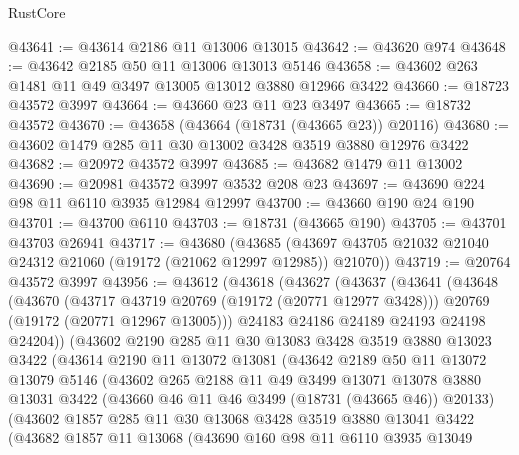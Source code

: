 \begin{lexlean}{RustCore}
\begin{coremodule}
@43641 := @43614 @2186 @11 @13006 @13015
@43642 := @43620 @974
@43648 := @43642 @2185 @50 @11 @13006 @13013 @5146
@43658 := @43602 @263 @1481 @11 @49 @3497 @13005 @13012 @3880 @12966 @3422
@43660 := @18723 @43572 @3997
@43664 := @43660 @23 @11 @23 @3497
@43665 := @18732 @43572
@43670 := @43658 (@43664 (@18731 (@43665 @23)) @20116)
@43680 := @43602 @1479 @285 @11 @30 @13002 @3428 @3519 @3880 @12976 @3422
@43682 := @20972 @43572 @3997
@43685 := @43682 @1479 @11 @13002
@43690 := @20981 @43572 @3997 @3532 @208 @23
@43697 := @43690 @224 @98 @11 @6110 @3935 @12984 @12997
@43700 := @43660 @190 @24 @190
@43701 := @43700 @6110
@43703 := @18731 (@43665 @190)
@43705 := @43701 @43703 @26941
@43717 := @43680
    (@43685 (@43697 @43705 @21032 @21040 @24312 @21060 (@19172 (@21062 @12997 @12985)) @21070))
@43719 := @20764 @43572 @3997
@43956 := @43612
    (@43618
      (@43627
        (@43637
          (@43641
            (@43648
              (@43670
                (@43717 @43719 @20769 (@19172 (@20771 @12977 @3428)))
                @20769
                (@19172 (@20771 @12967 @13005)))
              @24183
              @24186
              @24189
              @24193
              @24198
              @24204))
          (@43602
            @2190
            @285
            @11
            @30
            @13083
            @3428
            @3519
            @3880
            @13023
            @3422
            (@43614
              @2190
              @11
              @13072
              @13081
              (@43642
                @2189
                @50
                @11
                @13072
                @13079
                @5146
                (@43602
                  @265
                  @2188
                  @11
                  @49
                  @3499
                  @13071
                  @13078
                  @3880
                  @13031
                  @3422
                  (@43660 @46 @11 @46 @3499 (@18731 (@43665 @46)) @20133)
                  (@43602
                    @1857
                    @285
                    @11
                    @30
                    @13068
                    @3428
                    @3519
                    @3880
                    @13041
                    @3422
                    (@43682
                      @1857
                      @11
                      @13068
                      (@43690
                        @160
                        @98
                        @11
                        @6110
                        @3935
                        @13049

\end{coremodule}
\end{lexlean}
